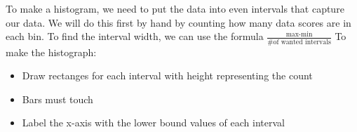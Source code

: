 \documentclass[../stats.tex]{subfiles}
\begin{document}
To make a histogram, we need to put the data into even intervals that capture our data. We will do this first by hand by counting how many data scores are in each bin.
\smallbreak
To find the interval width, we can use the formula $\frac{\text{max-min}}{\text{\# of wanted intervals}}$
\smallbreak
To make the histograph:
\begin{itemize}
    \item Draw rectanges for each interval with height representing the count
    \item Bars must touch
    \item Label the x-axis with the lower bound values of each interval
\end{itemize}
\end{document}
